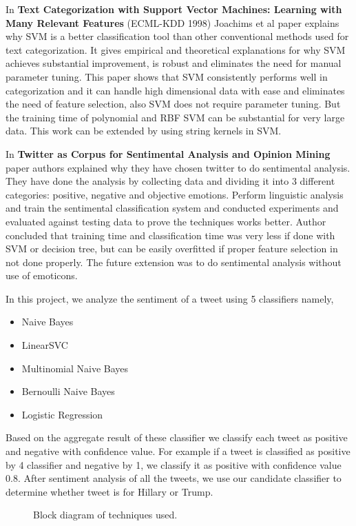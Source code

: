 \documentclass{acm_proc_article-sp}
\begin{document}
In \textbf{Text Categorization with Support Vector Machines: Learning with Many Relevant Features }(ECML-KDD 1998) Joachims et al \cite{cJoachims:tcwsvm} paper explains why SVM is a better classification tool than other conventional methods used for text categorization. It gives empirical and theoretical explanations for why SVM achieves substantial improvement, is robust and eliminates the need for manual parameter tuning. This paper shows that SVM consistently performs well in categorization and it can handle high dimensional data with ease and eliminates the need of feature selection, also SVM does not require parameter tuning. But the  training time of polynomial and RBF SVM can be substantial for very large data. This work can be extended by using string kernels in SVM.

In \textbf{Twitter as Corpus for Sentimental Analysis and Opinion Mining}
\cite{dPak:tacfsaaom}paper authors explained why they have chosen twitter to do sentimental analysis. They have done the analysis by collecting data and dividing it into 3 different categories: positive, negative and objective emotions. Perform linguistic analysis and train the sentimental classification system and conducted experiments and evaluated against testing data to prove the techniques works better. Author concluded that training time and classification time was very less if done with SVM or decision tree, but can be easily overfitted if proper feature selection in not done properly. The future extension was to do sentimental analysis without use of emoticons.

In this project, we analyze the sentiment of a tweet using 5 classifiers namely,
\begin{itemize}
\item Naive Bayes
\item LinearSVC
\item Multinomial Naive Bayes
\item Bernoulli Naive Bayes
\item Logistic Regression
\end{itemize}
Based on the aggregate result of these classifier we classify each tweet as positive and negative with confidence value. For example if a tweet is classified as positive by 4 classifier and negative by 1, we classify it as positive with confidence value 0.8. After sentiment analysis of all the tweets, we use our candidate classifier to determine whether tweet is for Hillary or Trump.

\begin{figure}
\centering
{}
\caption{Block diagram of techniques used.}
\end{figure}
\end{document}

